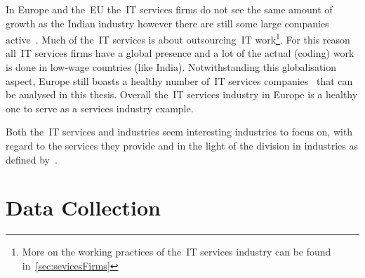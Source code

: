In Europe and the~\gls{EU} the~\gls{IT} services firms do not see the same amount of growth as the Indian industry however there are still some large companies active~\citep{Deloitte:2010}. 
Much of the~\gls{IT} services is about outsourcing~\gls{IT} work\footnote{More on the working practices of the~\gls{IT} services industry can be found in~\ref{sec:sevicesFirms}}.
For this reason all~\gls{IT} services firms have a global presence and a lot of the actual (coding) work is done in low-wage countries (like India). 
Notwithstanding this globalisation aspect, Europe still boasts a healthy number of~\gls{IT} services companies~\citep{Computer-Weekly:2011} that can be analysed in this thesis.
Overall the~\gls{IT} services industry in Europe is a healthy one to serve as a services industry example.

Both the~\gls{IT} services and \pharma industries seem interesting industries to focus on, with regard to the services they provide and in the light of the division in industries as defined by~\citep{Fisher:1939}.



\section{Data Collection}

